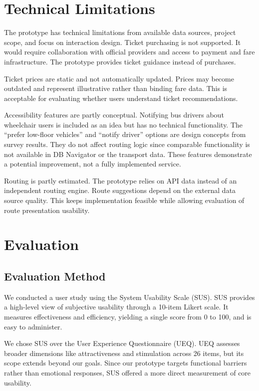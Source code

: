 \documentclass[12pt,a4paper]{article}
\begin{document}
\section{Technical Limitations}

The prototype has technical limitations from available data sources, project scope, and focus on interaction design. Ticket purchasing is not supported. It would require collaboration with official providers and access to payment and fare infrastructure. The prototype provides ticket guidance instead of purchases.

Ticket prices are static and not automatically updated. Prices may become outdated and represent illustrative rather than binding fare data. This is acceptable for evaluating whether users understand ticket recommendations.

Accessibility features are partly conceptual. Notifying bus drivers about wheelchair users is included as an idea but has no technical functionality. The ``prefer low-floor vehicles'' and ``notify driver'' options are design concepts from survey results. They do not affect routing logic since comparable functionality is not available in DB Navigator or the transport data. These features demonstrate a potential improvement, not a fully implemented service.

Routing is partly estimated. The prototype relies on API data instead of an independent routing engine. Route suggestions depend on the external data source quality. This keeps implementation feasible while allowing evaluation of route presentation usability.


\section{Evaluation}
\subsection{Evaluation Method}
We conducted a user study using the System Usability Scale (SUS). SUS provides a high-level view of subjective usability through a 10-item Likert scale. It measures effectiveness and efficiency, yielding a single score from 0 to 100, and is easy to administer.

We chose SUS over the User Experience Questionnaire (UEQ). UEQ assesses broader dimensions like attractiveness and stimulation across 26 items, but its scope extends beyond our goals. Since our prototype targets functional barriers rather than emotional responses, SUS offered a more direct measurement of core usability.
\end{document}
